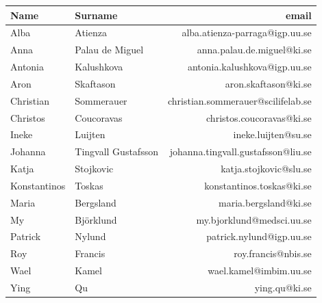 \documentclass[12pt]{article}\usepackage[]{graphicx}\usepackage[]{color}
\begin{document}
\begin{table}[ht]
\centering
\begin{tabular}{llr}
  \toprule
Name & Surname & email \\ 
  \midrule
Alba & Atienza & alba.atienza-parraga@igp.uu.se \\ 
   \rowcolor[gray]{0.95}Anna & Palau de Miguel & anna.palau.de.miguel@ki.se \\ 
  Antonia & Kalushkova & antonia.kalushkova@igp.uu.se \\ 
   \rowcolor[gray]{0.95}Aron & Skaftason & aron.skaftason@ki.se \\ 
  Christian & Sommerauer & christian.sommerauer@scilifelab.se \\ 
   \rowcolor[gray]{0.95}Christos & Coucoravas & christos.coucoravas@ki.se \\ 
  Ineke & Luijten & ineke.luijten@su.se \\ 
   \rowcolor[gray]{0.95}Johanna & Tingvall Gustafsson & johanna.tingvall.gustafsson@liu.se \\ 
  Katja & Stojkovic & katja.stojkovic@slu.se \\ 
   \rowcolor[gray]{0.95}Konstantinos & Toskas & konstantinos.toskas@ki.se \\ 
  Maria & Bergsland & maria.bergsland@ki.se \\ 
   \rowcolor[gray]{0.95}My & Björklund & my.bjorklund@medsci.uu.se \\ 
  Patrick & Nylund & patrick.nylund@igp.uu.se \\ 
   \rowcolor[gray]{0.95}Roy & Francis & roy.francis@nbis.se \\ 
  Wael & Kamel & wael.kamel@imbim.uu.se \\ 
   \rowcolor[gray]{0.95}Ying & Qu & ying.qu@ki.se \\ 
   \bottomrule
\end{tabular}
\end{table}
\end{document}

